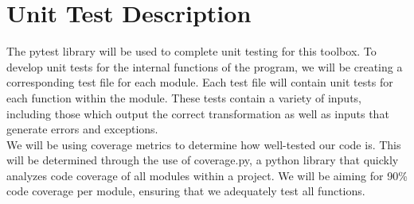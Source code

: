 \documentclass[12pt, titlepage]{article}
\begin{document}
\begin{table}[H]
\centering
{}
\caption{Traceability Matrix Showing the Connections Between Non Functional Requirements and their test.}
\label{Table:trace}
\end{table}


\section{Unit Test Description}

The pytest library will be used to complete unit testing for this toolbox. To develop unit tests for the internal functions of the program, we will be creating a corresponding test file for each module. Each test file will contain unit tests for each function within the module. These tests contain a variety of inputs, including those which output the correct transformation as well as inputs that generate errors and exceptions. \\

\noindent We will be using coverage metrics to determine how well-tested our code is. This will be determined through the use of coverage.py, a python library that quickly analyzes code coverage of all modules within a project. We will be aiming for 90\% code coverage per module, ensuring that we adequately test all functions. 
\end{document}
